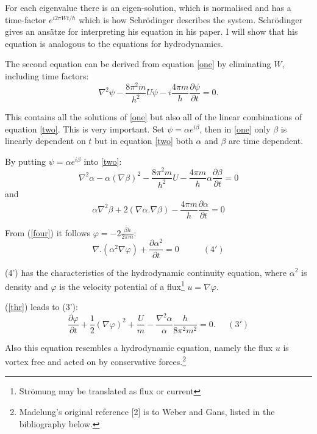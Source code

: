 For each eigenvalue there is an eigen-solution, which is normalised and has a time-factor $e^{i2\pi Wt/h}$ which is how Schr\"odinger describes the system. Schr\"odinger gives an ans\"atze for interpreting his equation in his paper. I will show that his equation is analogous to the equations for hydrodynamics.

The second equation can be derived from equation \ref{one} by eliminating $W$, including time factors:
\begin{equation}
\label{two}
\nabla^2 \psi - \frac{8 \pi^2 m}{h^2}U\psi - i\frac{4\pi m}{h}\frac{\partial\psi}{\partial t} = 0.
\end{equation}

This contains all the solutions of \ref{one} but also all of the linear combinations of equation \ref{two}. This is very important. Set $\psi = \alpha e^{i\beta}$, then in \ref{one} only $\beta$ is linearly dependent on $t$ but in equation \ref{two} both $\alpha$ and $\beta$ are time dependent.


By putting $\psi = \alpha e^{i\beta}$ into \ref{two}:
\begin{equation}
\label{thr}
\nabla^2\alpha-\alpha(\nabla\beta)^2 -\frac{8\pi^2 m}{h^2}U -\frac{4\pi m}{h}\alpha\frac{\partial\beta}{\partial t} = 0
\end{equation}
\noindent and
\begin{equation}
\label{four}
\alpha\nabla^2\beta +2(\nabla\alpha.\nabla\beta) -\frac{4\pi m}{h}\frac{\partial\alpha}{\partial t} = 0
\end{equation}

From (\ref{four}) it follows $\varphi = -2 \frac{\beta h}{2\pi m}$:
\[
\nabla.(\alpha^2 \nabla\varphi) + \frac{\partial\alpha^2}{\partial t} = 0 \;\;\;\;\;\;\;\;\;\; (4')
\]

\noindent (4') has the characteristics of the hydrodynamic continuity equation, where $\alpha^2$ is density and $\varphi$ is the velocity potential of a flux\footnote{Str\"omung may be translated as flux or current} $u = \nabla \varphi$.

(\ref{thr}) leads to (3'):
\[
\frac{\partial\varphi}{\partial t} + \frac{1}{2}(\nabla\varphi)^2 +\frac{U}{m}-\frac{\nabla^2\alpha}{\alpha}\frac{h}{8\pi^2 m^2} = 0. \;\;\;\;\; (3')
\]

\noindent Also this equation resembles a hydrodynamic equation, namely the flux $u$ is vortex free and acted on by conservative forces.\footnote{Madelung's original reference [2] is to Weber and Gans, listed in the bibliography below.}

